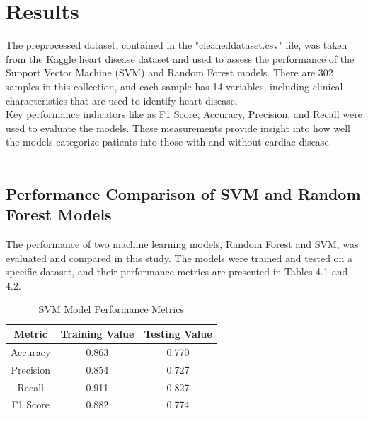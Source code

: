 \chapter{Results}
\label{ch:results}
The preprocessed dataset, contained in the "cleaneddataset.csv" file, was taken from the Kaggle heart disease dataset and used to assess the performance of the Support Vector Machine (SVM) and Random Forest models. There are 302 samples in this collection, and each sample has 14 variables, including clinical characteristics that are used to identify heart disease.
\\
Key performance indicators like as F1 Score, Accuracy, Precision, and Recall were used to evaluate the models. These measurements provide insight into how well the models categorize patients into those with and without cardiac disease. 
\\

\\
\section{Performance Comparison of SVM and Random Forest Models}


The performance of two machine learning models, Random Forest and SVM, was evaluated and compared in this study. The models were trained and tested on a specific dataset, and their performance metrics are presented in Tables 4.1 and 4.2.
\\
\begin{table}[h]
\centering
\caption{SVM Model Performance Metrics}
\begin{tabular}{|c|c|c|}
\hline
Metric & Training Value & Testing Value \\
\hline
Accuracy & 0.863 & 0.770 \\
\hline
Precision & 0.854 & 0.727\\
\hline
Recall & 0.911 & 0.827 \\
\hline
F1 Score & 0.882 & 0.774 \\
\hline
\end{tabular}
\end{table}

